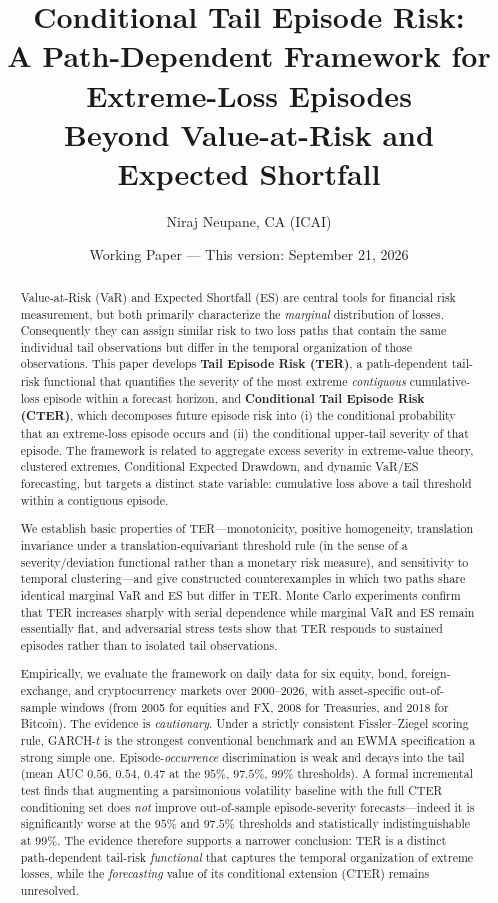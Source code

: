 \documentclass[11pt]{article}
\title{\bfseries Conditional Tail Episode Risk:\\ A Path-Dependent Framework for Extreme-Loss Episodes\\ Beyond Value-at-Risk and Expected Shortfall}
\author{Niraj Neupane, CA (ICAI)}
\affil{\normalsize Quantitative Researcher, Korvane \quad$\cdot$\quad Financial Economist, Calderyn Institute\\
\normalsize ORCID: 0009-0003-7026-7026 \quad$\cdot$\quad \texttt{nirajneupane17@gmail.com}}
\date{Working Paper --- This version: September 21, 2026}
\begin{document}
\maketitle

\begin{abstract}
\noindent Value-at-Risk (VaR) and Expected Shortfall (ES) are central tools for financial risk
measurement, but both primarily characterize the \emph{marginal} distribution of losses. Consequently
they can assign similar risk to two loss paths that contain the same individual tail observations but
differ in the temporal organization of those observations. This paper develops \textbf{Tail Episode Risk
(TER)}, a path-dependent tail-risk functional that quantifies the severity of the most extreme
\emph{contiguous} cumulative-loss episode within a forecast horizon, and \textbf{Conditional Tail Episode
Risk (CTER)}, which decomposes future episode risk into (i) the conditional probability that an
extreme-loss episode occurs and (ii) the conditional upper-tail severity of that episode. The framework is
related to aggregate excess severity in extreme-value theory, clustered extremes, Conditional Expected
Drawdown, and dynamic VaR/ES forecasting, but targets a distinct state variable: cumulative loss above a
tail threshold within a contiguous episode.

We establish basic properties of TER---monotonicity, positive homogeneity, translation invariance
under a translation-equivariant threshold rule (in the sense of a severity/deviation functional rather than
a monetary risk measure), and sensitivity to temporal clustering---and give constructed
counterexamples in which two paths share identical marginal VaR and ES but differ in TER. Monte Carlo
experiments confirm that TER increases sharply with serial dependence while marginal VaR and ES remain
essentially flat, and adversarial stress tests show that TER responds to sustained episodes rather than to
isolated tail observations.

Empirically, we evaluate the framework on daily data for six equity, bond, foreign-exchange, and
cryptocurrency markets over 2000--2026, with asset-specific out-of-sample windows (from 2005 for equities
and FX, 2008 for Treasuries, and 2018 for Bitcoin). The evidence is \emph{cautionary}. Under
a strictly consistent Fissler--Ziegel scoring rule, GARCH-$t$ is the strongest conventional benchmark and
an EWMA specification a strong simple one. Episode-\emph{occurrence} discrimination is weak and decays into
the tail (mean AUC $0.56$, $0.54$, $0.47$ at the $95\%$, $97.5\%$, $99\%$ thresholds). A formal incremental
test finds that augmenting a parsimonious volatility baseline with the full CTER conditioning set does
\emph{not} improve out-of-sample episode-severity forecasts---indeed it is significantly worse at the
$95\%$ and $97.5\%$ thresholds and statistically indistinguishable at $99\%$. The evidence therefore
supports a narrower conclusion: TER is a distinct path-dependent tail-risk \emph{functional} that captures
the temporal organization of extreme losses, while the \emph{forecasting} value of its conditional
extension (CTER) remains unresolved.


\end{abstract}
\end{document}
